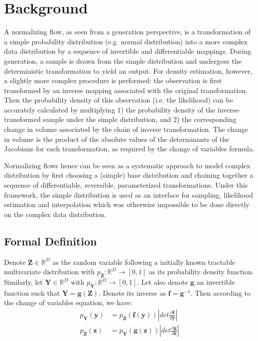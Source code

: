 \section{Background}

A normalizing flow, as seen from a generation perspective, is a transformation
of a simple probability distribution (e.g. normal distribution) into a more
complex data distribution by a sequence of invertible and differentiable
mappings. During generation, a sample is drawn from the simple distribution and
undergoes the deterministic transformation to yield an output. For density
estimation, however, a slightly more complex procedure is performed: the
observation is first transformed by an inverse mapping associated with the
original transformation. Then the probability density of this observation (i.e.
the likelihood) can be accurately calculated by multiplying 1) the
probability density of the inverse-transformed sample under the simple
distribution, and 2) the corresponding change in volume associated by the chain of
inverse transformation. The change in volume is the product of the absolute
values of the determinants of the Jacobians for each transformation, as required
by the change of variables formula.

Normalizing flows hence can be seen as a systematic approach to model complex
distribution by first choosing a (simple) base distribution and chaining
together a sequence of differentiable, reversible, parameterized
transformations. Under this framework, the simple distribution is used as an
interface for sampling, likelihood estimation and interpolation which was
otherwise impossible to be done directly on the complex data distribution.

\subsection{Formal Definition}

Denote $\mathbf{Z} \in \mathbb{R}^D$ as the random variable following a
initially known tractable multivariate distribution with $p_{\mathbf{Z}}:
\mathbb{R}^D \to [0,1]$ as its probability density function. Similarly, let
$\mathbf{Y} \in \mathbb{R}^D$ with $p_{\mathbf{Y}}: \mathbb{R}^D \to [0,1]$. Let
also denote $\mathbf{g}$ an invertible function such that $\mathbf{Y} =
\mathbf{g}(\mathbf{Z})$. Denote its inverse as $\mathbf{f} = \mathbf{g}^{-1}$.
Then according to the change of variables equation, we have:
\begin{align}
  p_{\mathbf{Y}}(\mathbf{y}) &= p_{\mathbf{Z}}(\mathbf{f}(\mathbf{y})) \left|det
  \frac{\partial \mathbf{f}}{\partial \mathbf{y} } \right| \\
  p_{\mathbf{Z}}(\mathbf{z}) &= p_{\mathbf{Y}}(\mathbf{g}(\mathbf{z})) \left|det
  \frac{\partial \mathbf{g}}{\partial \mathbf{z} } \right|
\end{align}

